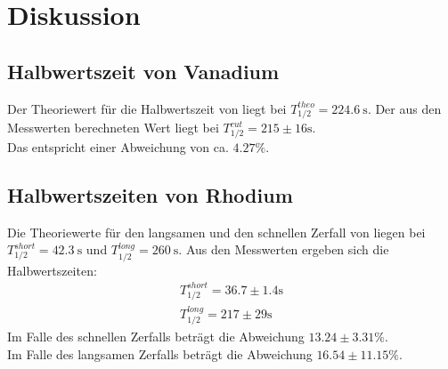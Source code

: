 \newpage
\section{Diskussion}
\label{Diskussion}

\subsection{Halbwertszeit von Vanadium}
Der Theoriewert für die Halbwertszeit von  liegt bei $T^{theo}_{1/2} = \SI{224.6}{\second}$\cite{vana}.
Der aus den Messwerten berechneten Wert liegt bei $T^{cut}_{1/2} = 215\pm 16\si{\second}$.\\
Das entspricht einer Abweichung von ca. $4.27\%$.
\subsection{Halbwertszeiten von Rhodium}
Die Theoriewerte für den langsamen und den schnellen Zerfall von  liegen bei $T^{short}_{1/2} = \SI{42.3}{\second}$\cite{rh1} und $T^{long}_{1/2} = \SI{260}{\second}$\cite{rh2}.
Aus den Messwerten ergeben sich die Halbwertszeiten:
\begin{align*}
    T^{short}_{1/2} = 36.7\pm 1.4\si{\second}\\
    T^{long}_{1/2} = 217\pm 29\si{\second}
\end{align*}
Im Falle des schnellen Zerfalls beträgt die Abweichung $13.24\pm 3.31\%$.\\
Im Falle des langsamen Zerfalls beträgt die Abweichung $16.54\pm 11.15\%$.
